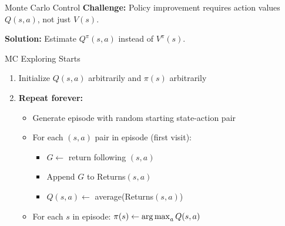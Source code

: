 \documentclass[aspectratio=169]{beamer}
\begin{document}
\begin{frame}{Monte Carlo Control}
  \textbf{Challenge:} Policy improvement requires action values $Q(s,a)$, not just $V(s)$.

  \vspace{0.5em}

  \textbf{Solution:} Estimate $Q^\pi(s,a)$ instead of $V^\pi(s)$.

  \vspace{0.5em}

  \begin{examplebox}{MC Exploring Starts}
    \begin{enumerate}
      \item Initialize $Q(s,a)$ arbitrarily and $\pi(s)$ arbitrarily
      \item \textbf{Repeat forever:}
      \begin{itemize}
        \item Generate episode with random starting state-action pair
        \item For each $(s,a)$ pair in episode (first visit):
        \begin{itemize}
          \item $G \leftarrow$ return following $(s,a)$
          \item Append $G$ to Returns$(s,a)$
          \item $Q(s,a) \leftarrow$ average(Returns$(s,a)$)
        \end{itemize}
        \item For each $s$ in episode: $\pi(s) \leftarrow \operatorname*{arg\,max}_a Q(s,a)$
      \end{itemize}
    \end{enumerate}
  \end{examplebox}
\end{frame}
\end{document}
